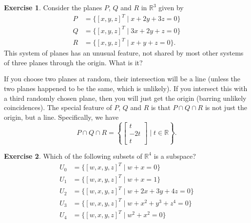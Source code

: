 \documentclass{amsart}
\newcommand{\R}         {{\mathbb{R}}}
\newcommand{\bsm}       {\left[\begin{smallmatrix}}
\newcommand{\esm}       {\end{smallmatrix}\right]}
\newcommand{\st}        {\;|\;}
\renewcommand{\:}       {\colon}
\theoremstyle{definition}
\newtheorem{exercise}{Exercise}[section]
\renewenvironment{solution}{\SolutionAtEnd}{\endSolutionAtEnd}
\begin{document}
\begin{exercise}
 Consider the planes $P$, $Q$ and $R$ in $\R^3$ given by 
 \begin{align*}
  P &= \{ [x,y,z]^T \st x+2y+3z=0 \} \\
  Q &= \{ [x,y,z]^T \st 3x+2y+z=0 \} \\
  R &= \{ [x,y,z]^T \st x+y+z=0 \}.
 \end{align*}
 This system of planes has an unusual feature, not shared by
 most other systems of three planes through the origin.
 What is it? 
\end{exercise}
\begin{solution}
 If you choose two planes at random, their intersection will
 be a line (unless the two planes happened to be the same,
 which is unlikely).  If you intersect this with a third
 randomly chosen plane, then you will just get the origin
 (barring unlikely coincidences).  The special feature of
 $P$, $Q$ and $R$ is that $P\cap Q\cap R$ is not just the
 origin, but a line.  Specifically, we have
 \[ P\cap Q\cap R =
      \left\{\bsm t\\ -2t\\ t\esm \st t\in\R\right\}.
 \]
\end{solution}
\begin{exercise}
 Which of the following subsets of $\R^4$ is a subspace?
 \begin{align*}
  U_0 &= \{[w,x,y,z]^T \st w+x=0\} \\
  U_1 &= \{[w,x,y,z]^T \st w+x=1\} \\
  U_2 &= \{[w,x,y,z]^T \st w+2x+3y+4z=0\} \\
  U_3 &= \{[w,x,y,z]^T \st w+x^2+y^3+z^4=0\} \\
  U_4 &= \{[w,x,y,z]^T \st w^2 + x^2=0\}
 \end{align*}
\end{exercise}
\end{document}
